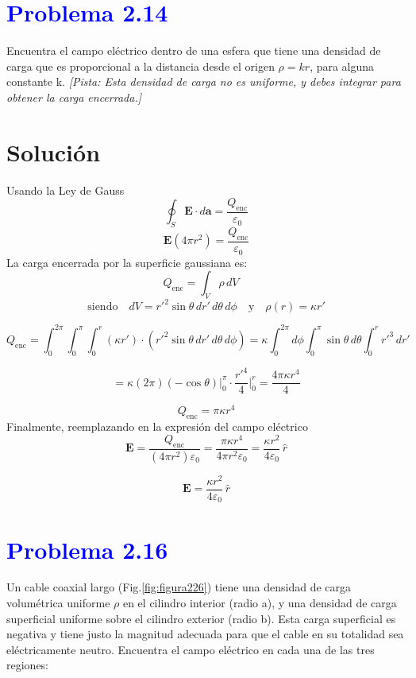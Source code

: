 \documentclass[12pt]{article}
\begin{document}
\section*{\textcolor{blue}{Problema 2.14}}

Encuentra el campo eléctrico dentro de una esfera que tiene una densidad de carga que es proporcional a la distancia desde el origen \(\rho = kr\), para alguna constante k.
\textit{[Pista: Esta densidad de carga no es uniforme, y debes integrar para obtener la carga encerrada.]}


\section*{Solución}

Usando la Ley de Gauss \[\oint_S \mathbf{E} \cdot d\mathbf{a} = \frac{Q_{\text{enc}}}{\varepsilon_0}
\]
\[
\textbf{E}(4\pi r^2) = \frac{Q_{\text{enc}}}{\varepsilon_0}
\]
La carga encerrada por la superficie gaussiana es:
\[
Q_{\text{enc}} = \int_V \rho \, dV \quad 
\]
\[
\text{siendo} \quad dV = r'^2 \sin\theta \, dr' \, d\theta \, d\phi
\quad \text{y} \quad \rho(r) = \kappa r'
\]

\[
Q_{\text{enc}} = \int_0^{2\pi} \int_0^{\pi} \int_0^r (\kappa r') \cdot (r'^2 \sin\theta \, dr' \, d\theta \, d\phi )
= \kappa \int_0^{2\pi} d\phi \int_0^{\pi} \sin\theta \, d\theta \int_0^r r'^3 \, dr'
\]

\[
= \kappa (2\pi)(-\cos\theta)\Big|_0^{\pi} \cdot \frac{r'^4}{4} \Big|_0^{r}
= \frac{4\pi \kappa r^4}{4}
\]

\[
Q_{\text{enc}} = \pi \kappa r^4
\]
Finalmente, reemplazando en la expresión del campo eléctrico
\[
\mathbf{E}  
= \frac{Q_{\text{enc}}}{(4\pi r^2)\varepsilon_0} 
= \frac{\pi \kappa r^4}{4\pi r^2 \varepsilon_0}
= \frac{\kappa r^2}{4\varepsilon_0} \, \hat{r}
\]

\[
\boxed{\mathbf{E} = \frac{\kappa r^2}{4\varepsilon_0} \, \hat{r}}
\]


\section*{\textcolor{blue}{Problema 2.16}}


Un cable coaxial largo (Fig.\ref{fig:figura226}) tiene una densidad de carga volumétrica uniforme \(\rho \) en el cilindro interior (radio a), y una densidad de carga superficial uniforme sobre el cilindro exterior (radio b). Esta carga superficial es negativa y tiene justo la magnitud adecuada para que el cable en su totalidad sea eléctricamente neutro.
Encuentra el campo eléctrico en cada una de las tres regiones:
\end{document}
